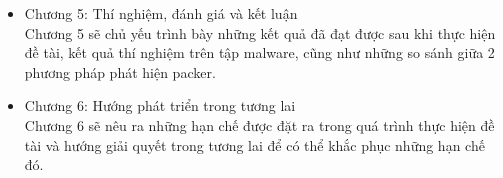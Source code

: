 \begin{itemize}[leftmargin=*]
\item{Chương 5: Thí nghiệm, đánh giá và kết luận\\
\hspace*{0.5cm}Chương 5 sẽ chủ yếu trình bày những kết quả đã đạt được sau khi thực hiện đề tài, kết quả thí nghiệm trên tập malware, cũng như những so sánh giữa 2 phương pháp phát hiện packer.\\}
\item{Chương 6: Hướng phát triển trong tương lai\\
\hspace*{0.5cm}Chương 6 sẽ nêu ra những hạn chế được đặt ra trong quá trình thực hiện đề tài và hướng giải quyết trong tương lai để có thể khắc phục những hạn chế đó.}
\end{itemize}
